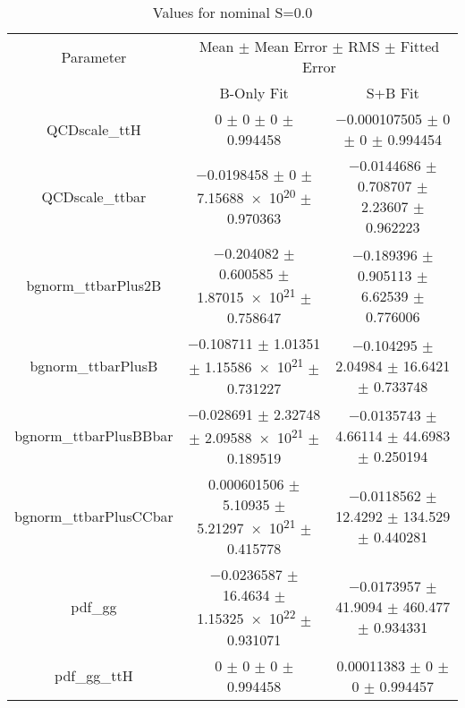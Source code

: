 \begin{table}
\centering
\caption{Values for nominal S=0.0}
\begin{tabular}{ccc}
\toprule
Parameter & \multicolumn{2}{c}{Mean $\pm$ Mean Error $\pm$ RMS $\pm$ Fitted Error}\\
 & B-Only Fit & S+B Fit\\
\midrule
QCDscale\_ttH & \num{0} $\pm$ \num{0} $\pm$ \num{0} $\pm$ \num{0.994458} & \num{-0.000107505} $\pm$ \num{0} $\pm$ \num{0} $\pm$ \num{0.994454}\\
QCDscale\_ttbar & \num{-0.0198458} $\pm$ \num{0} $\pm$ \num{7.15688e+20} $\pm$ \num{0.970363} & \num{-0.0144686} $\pm$ \num{0.708707} $\pm$ \num{2.23607} $\pm$ \num{0.962223}\\
bgnorm\_ttbarPlus2B & \num{-0.204082} $\pm$ \num{0.600585} $\pm$ \num{1.87015e+21} $\pm$ \num{0.758647} & \num{-0.189396} $\pm$ \num{0.905113} $\pm$ \num{6.62539} $\pm$ \num{0.776006}\\
bgnorm\_ttbarPlusB & \num{-0.108711} $\pm$ \num{1.01351} $\pm$ \num{1.15586e+21} $\pm$ \num{0.731227} & \num{-0.104295} $\pm$ \num{2.04984} $\pm$ \num{16.6421} $\pm$ \num{0.733748}\\
bgnorm\_ttbarPlusBBbar & \num{-0.028691} $\pm$ \num{2.32748} $\pm$ \num{2.09588e+21} $\pm$ \num{0.189519} & \num{-0.0135743} $\pm$ \num{4.66114} $\pm$ \num{44.6983} $\pm$ \num{0.250194}\\
bgnorm\_ttbarPlusCCbar & \num{0.000601506} $\pm$ \num{5.10935} $\pm$ \num{5.21297e+21} $\pm$ \num{0.415778} & \num{-0.0118562} $\pm$ \num{12.4292} $\pm$ \num{134.529} $\pm$ \num{0.440281}\\
pdf\_gg & \num{-0.0236587} $\pm$ \num{16.4634} $\pm$ \num{1.15325e+22} $\pm$ \num{0.931071} & \num{-0.0173957} $\pm$ \num{41.9094} $\pm$ \num{460.477} $\pm$ \num{0.934331}\\
pdf\_gg\_ttH & \num{0} $\pm$ \num{0} $\pm$ \num{0} $\pm$ \num{0.994458} & \num{0.00011383} $\pm$ \num{0} $\pm$ \num{0} $\pm$ \num{0.994457}\\
\bottomrule
\end{tabular}
\end{table}